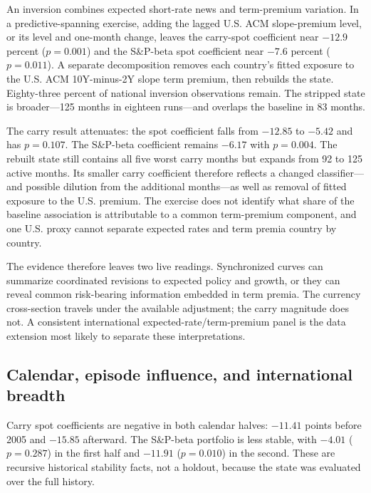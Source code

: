 An inversion combines expected short-rate news and term-premium variation. In a predictive-spanning exercise, adding the lagged U.S. ACM slope-premium level, or its level and one-month change, leaves the carry-spot coefficient near $-12.9$ percent ($p=0.001$) and the S\&P-beta spot coefficient near $-7.6$ percent ($p=0.011$). A separate decomposition removes each country's fitted exposure to the U.S. ACM 10Y-minus-2Y slope term premium, then rebuilds the state. Eighty-three percent of national inversion observations remain. The stripped state is broader—125 months in eighteen runs—and overlaps the baseline in 83 months.

The carry result attenuates: the spot coefficient falls from $-12.85$ to $-5.42$ and has $p=0.107$. The S\&P-beta coefficient remains $-6.17$ with $p=0.004$. The rebuilt state still contains all five worst carry months but expands from 92 to 125 active months. Its smaller carry coefficient therefore reflects a changed classifier---and possible dilution from the additional months---as well as removal of fitted exposure to the U.S. premium. The exercise does not identify what share of the baseline association is attributable to a common term-premium component, and one U.S. proxy cannot separate expected rates and term premia country by country.


The evidence therefore leaves two live readings. Synchronized curves can summarize coordinated revisions to expected policy and growth, or they can reveal common risk-bearing information embedded in term premia. The currency cross-section travels under the available adjustment; the carry magnitude does not. A consistent international expected-rate/term-premium panel is the data extension most likely to separate these interpretations.

\subsection{Calendar, episode influence, and international breadth}

Carry spot coefficients are negative in both calendar halves: $-11.41$ points before 2005 and $-15.85$ afterward. The S\&P-beta portfolio is less stable, with $-4.01$ ($p=0.287$) in the first half and $-11.91$ ($p=0.010$) in the second. These are recursive historical stability facts, not a holdout, because the state was evaluated over the full history.

